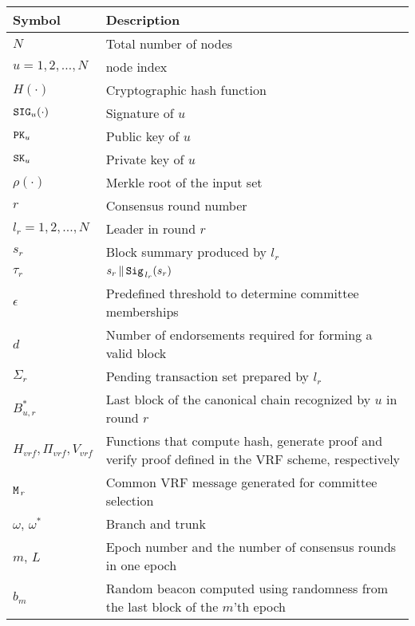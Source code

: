 \documentclass{article}
\begin{document}
\begin{longtable}{p{3cm} p{10cm}}
    Symbol  & Description \\
    \hline\hline
    $N$ & Total number of nodes \\
    \hline
    $u=1,2,\dots,N$ & node index \\
    \hline
    $H(\cdot)$ & Cryptographic hash function \\
    \hline
    ${\tt SIG}_u(\cdot)$ & Signature of $u$ \\
    \hline
    ${\tt PK}_u$ & Public key of $u$ \\
    \hline
    ${\tt SK}_u$ & Private key of $u$ \\
    \hline
    $\rho\left(\cdot\right)$ & Merkle root of the input set\\
    \hline
    $r$ & Consensus round number \\
    \hline
    $l_r=1,2,...,N$ & Leader in round $r$ \\
    \hline
    $s_r$ & Block summary produced by $l_r$ \\
    \hline
    $\tau_r$ & $s_r\,\|\,{\tt Sig}_{\,l_r}(s_r)$ \\
    \hline
    $\epsilon$ & Predefined threshold to determine committee memberships \\
    \hline
    $d$ & Number of endorsements required for forming a valid block \\
    \hline
    $\Sigma_r$ & Pending transaction set prepared by $l_r$ \\
    \hline
    $B_{u,r}^*$ & Last block of the canonical chain recognized by $u$ in round $r$\\ 
    \hline
    $H_{vrf},\Pi_{vrf},V_{vrf}$ & Functions that compute hash, generate proof and verify proof defined in the VRF scheme, respectively \\
    \hline
    ${\tt M}_{\,r}$ & Common VRF message generated for committee selection \\
    \hline
    $\omega$, $\omega^*$ & Branch and trunk \\
    \hline
    $m$, $L$ & Epoch number and the number of consensus rounds in one epoch \\
    \hline
    $b_m$ & Random beacon computed using randomness from the last block of the $m$'th epoch \\
    \hline
\end{longtable}
\end{document}
